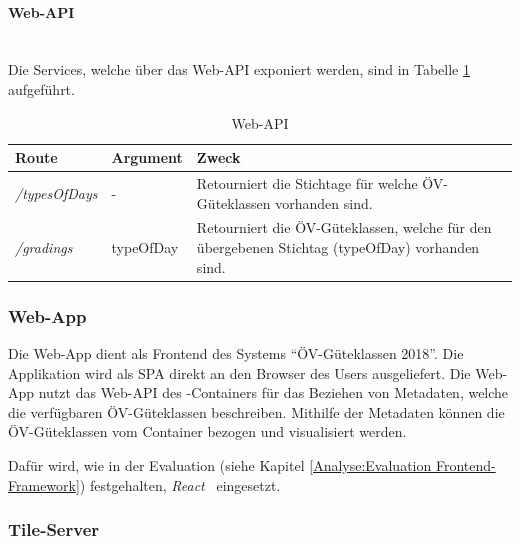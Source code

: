 \paragraph{Web-\ac{API}}~\\
Die Services, welche über das Web-\ac{API} exponiert werden, sind in Tabelle \ref{table:Wep-API} aufgeführt.

\begin{table}[H]
    \centering
    \begin{tabular}[c]{l l p{10.5cm}}
        \toprule
        \textbf{Route}          
                                & \textbf{Argument}
                                & \textbf{Zweck}\\
        \midrule
        \emph{/typesOfDays}
                                & -
                                & Retourniert die Stichtage für welche \acs{ÖV}-Güteklassen vorhanden sind.\\
        \emph{/gradings}        & typeOfDay
                                & Retourniert die \acs{ÖV}-Güteklassen, welche für den übergebenen Stichtag (typeOfDay) vorhanden sind.\\
        \bottomrule
    \end{tabular}
    \caption{Web-\ac{API}}
    \label{table:Wep-API}
\end{table}


\subsubsection{Web-App}
\label{container:Web-App}

Die Web-App dient als Frontend des Systems "`\acs{ÖV}-Güteklassen 2018"'.
Die Applikation wird als \ac{SPA} direkt an den Browser des Users ausgeliefert.
Die Web-App nutzt das Web-\ac{API} des -Containers für das Beziehen von Metadaten, welche die verfügbaren ÖV-Güteklassen beschreiben.
Mithilfe der Metadaten können die ÖV-Güteklassen vom Container  bezogen und visualisiert werden.

Dafür wird, wie in der Evaluation (siehe Kapitel \ref{Analyse:Evaluation Frontend-Framework}) festgehalten, \emph{React}~\cite{react} eingesetzt.

\subsubsection{Tile-Server}
\label{container:Tile-Server}

